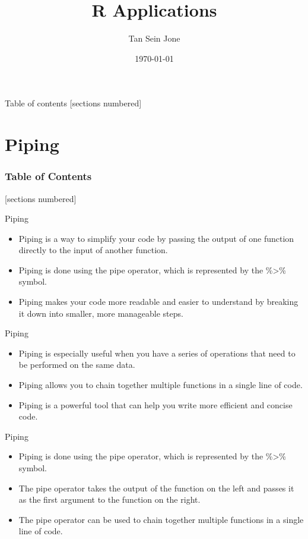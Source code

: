 \documentclass[serif, 9pt, aspectratio=32]{beamer}
\title{R Applications}
\date{\today}
\author{Tan Sein Jone}
\institute{University of British Columbia}
\begin{document}
\maketitle

\begin{frame}{Table of contents}
    [sections numbered]
    \tableofcontents[hideallsubsections]
\end{frame}

\section{Piping}

\begin{frame}
    \frametitle{Table of Contents}
    [sections numbered]
    \tableofcontents[currentsection]
\end{frame}

\begin{frame}{Piping}
    \begin{itemize}
        \setlength{\itemsep}{2em}
        \item Piping is a way to simplify your code by passing the output of one function directly to the input of another function.
        \item Piping is done using the pipe operator, which is represented by the \%\textgreater\% symbol.
        \item Piping makes your code more readable and easier to understand by breaking it down into smaller, more manageable steps.
    \end{itemize}
\end{frame}

\begin{frame}{Piping}
    \begin{itemize}
        \setlength{\itemsep}{2em}
        \item Piping is especially useful when you have a series of operations that need to be performed on the same data.
        \item Piping allows you to chain together multiple functions in a single line of code.
        \item Piping is a powerful tool that can help you write more efficient and concise code.
    \end{itemize}
\end{frame}

\begin{frame}{Piping}
    \begin{itemize}
        \setlength{\itemsep}{2em}
        \item Piping is done using the pipe operator, which is represented by the \%\textgreater\% symbol.
        \item The pipe operator takes the output of the function on the left and passes it as the first argument to the function on the right.
        \item The pipe operator can be used to chain together multiple functions in a single line of code.
    \end{itemize}
\end{frame}
\end{document}
